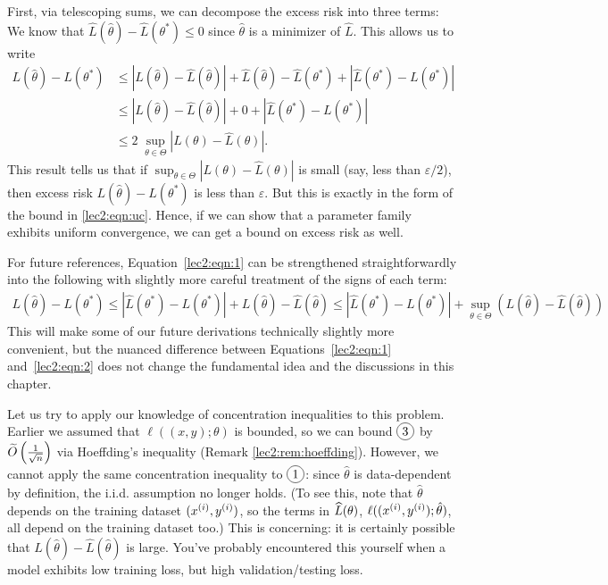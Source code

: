 First, via telescoping sums, we can decompose the excess risk into three terms:
We know that $\hat{L}(\hat{\theta}) - \hat{L}(\theta^*) \leq 0$ since $\hat{\theta}$ is a minimizer of $\hat{L}$. This allows us to write
\begin{align}
L(\hat{\theta}) - L(\theta^*) &\leq |L(\hat{\theta}) - \hat{L}(\hat{\theta})| + \hat{L}(\hat{\theta}) - \hat{L}(\theta^*) + |\hat{L}(\theta^*) - L(\theta^*)|\\
&\leq |L(\hat{\theta}) - \hat{L}(\hat{\theta})| + 0 + |\hat{L}(\theta^*) - L(\theta^*)|\\
&\leq 2\;\sup_{\theta \in \Theta } |L(\theta) - \hat{L}(\theta)|. \label{lec2:eqn:1}
\end{align}
This result tells us that if $\sup_{\theta \in \Theta } |L(\theta) - \hat{L}(\theta)|$ is small (say, less than $\varepsilon/2$), then excess risk $L(\hat{\theta}) - L(\theta^*)$ is less than $\varepsilon$. But this is exactly in the form of the bound in \eqref{lec2:eqn:uc}. Hence, if we can show that a parameter family exhibits uniform convergence, we can get a bound on excess risk as well.

For future references, Equation~\eqref{lec2:eqn:1} can be strengthened straightforwardly into the following with slightly more careful treatment of the signs of each term:
\begin{align}
L(\hat{\theta}) - L(\theta^*) \le |\hat{L}(\theta^*) - L(\theta^*)|+  L(\hat{\theta}) - \hat{L}(\hat{\theta})  \le |\hat{L}(\theta^*) - L(\theta^*)|+ \sup_{\theta \in \Theta} \left(L(\hat{\theta}) - \hat{L}(\hat{\theta})\right)\label{lec2:eqn:2}
\end{align}
This will make some of our future derivations technically slightly more convenient, but the nuanced difference between Equations~\eqref{lec2:eqn:1} and~\eqref{lec2:eqn:2} does not change the fundamental idea and the discussions in this chapter. 

Let us try to apply our knowledge of concentration inequalities to this problem. Earlier we assumed that $\ell((x, y); \theta)$ is bounded, so we can bound $\circled{3}$  
by $\tilO\left(\frac{1}{\sqrt{n}}\right)$ via Hoeffding's inequality (Remark \ref{lec2:rem:hoeffding}). However, we cannot apply the same concentration inequality to $\circled{1}$: since $\hat{\theta}$ is data-dependent by definition, the i.i.d. assumption no longer holds. (To see this, note that $\hat\theta$ depends on the training dataset $(x\sp{i}, y\sp{i})$, so the terms in $\hatL (\theta)$, $\ell ((x\sp{i}, y\sp{i}); \hat\theta)$, all depend on the training dataset too.) This is concerning: it is certainly possible that $L(\hat{\theta}) - \hat{L}(\hat{\theta})$ is large. You've probably encountered this yourself when a model exhibits low training loss, but high validation/testing loss. 

